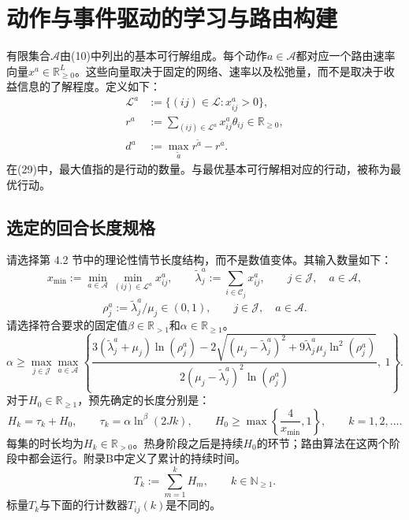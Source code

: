 \documentclass{article}
\begin{document}
\section*{动作与事件驱动的学习与路由构建}

有限集合$\mathcal A$由(10)中列出的基本可行解组成。每个动作$a\in\mathcal A$都对应一个路由速率向量$x^a\in\mathbb R_{\geq0}^{L}$。这些向量取决于固定的网络、速率以及松弛量，而不是取决于收益信息的了解程度。定义如下：
\begin{align}
\mathcal L^a&:=\{(ij)\in\mathcal L:x^a_{ij}>0\},\tag{27}\\
r^a&:=\sum_{(ij)\in\mathcal L^a}x^a_{ij}\theta_{ij}\in\mathbb R_{\geq0},\tag{28}\\
d^a&:=\max_{\tilde a}r^{\tilde a}-r^a.\tag{29}
\end{align}
在(29)中，最大值指的是行动的数量。与最优基本可行解相对应的行动，被称为最优行动。

\subsection*{选定的回合长度规格}

请选择第 4.2 节中的理论性情节长度结构，而不是数值变体。其输入数量如下：
\[
x_{\min}:=\min_{a\in\mathcal A}\min_{(ij)\in\mathcal L^a}x^a_{ij},\qquad
\widetilde\lambda^a_j:=\sum_{i\in\mathcal C_j}x^a_{ij},
\qquad j\in\mathcal J,\quad a\in\mathcal A,
\]
\begin{equation}
\rho^a_j:=\widetilde\lambda^a_j/\mu_j\in(0,1),
\qquad j\in\mathcal J,\quad a\in\mathcal A.
\tag{34}
\end{equation}
请选择符合要求的固定值$\beta\in\mathbb R_{>1}$和$\alpha\in\mathbb R_{\geq1}$。
\begin{equation}
\alpha\geq\max_{j\in\mathcal J}\max_{a\in\mathcal A}
\left\{
\frac{3(\widetilde\lambda^a_j+\mu_j)\ln(\rho^a_j)
-2\sqrt{(\mu_j-\widetilde\lambda^a_j)^2+
9\widetilde\lambda^a_j\mu_j\ln^2(\rho^a_j)}}
{2(\mu_j-\widetilde\lambda^a_j)^2\ln(\rho^a_j)},\ 1
\right\}.
\tag{35}
\end{equation}
对于$H_0\in\mathbb R_{\geq1}$，预先确定的长度分别是：
\begin{equation}
H_k=\tau_k+H_0,\qquad
\tau_k=\alpha\ln^\beta(2Jk),\qquad
H_0\geq\max\left\{\frac4{x_{\min}},1\right\},
\qquad k=1,2,\ldots.
\tag{36}
\end{equation}
每集的时长均为$H_k\in\mathbb R_{>0}$。热身阶段之后是持续$H_0$的环节；路由算法在这两个阶段中都会运行。附录B中定义了累计的持续时间。
\begin{equation}
T_k:=\sum_{m=1}^{k}H_m,\qquad k\in\mathbb N_{\geq1}.
\tag{75}
\end{equation}
标量$T_k$与下面的行计数器$T_{ij}(k)$是不同的。
\end{document}
